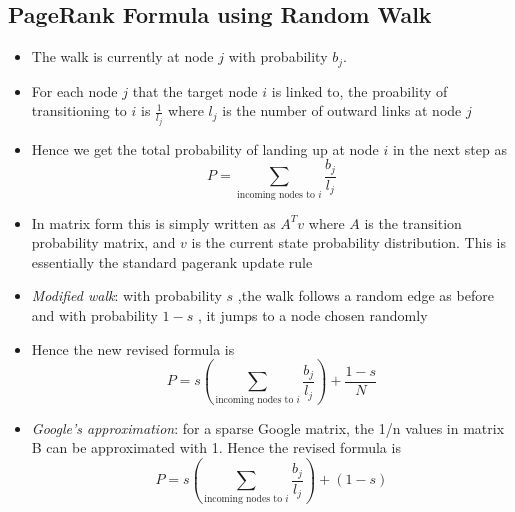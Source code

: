 \documentclass{article}
\begin{document}
\subsection{PageRank Formula using Random Walk}
\begin{itemize}
    \item The walk is currently at node $j$ with probability $b_j$. 
    
    \item For each node $j$ that the target node $i$ is linked to, the proability of transitioning to $i$ is $\frac{1}{l_j}$ where $l_j$ is the number of outward links at node $j$
    
    \item Hence we get the total probability of landing up at node $i$ in the next step as
    \begin{equation*}
        P = \sum_{\text{incoming nodes to $i$}} \frac{b_j}{l_j}
    \end{equation*}
    
    \item In matrix form this is simply written as $A^{T}v$ where $A$ is the transition probability matrix, and $v$ is the current state probability distribution. This is essentially the standard pagerank update rule
    
    \item \textit{Modified walk}: with probability $s$ ,the walk follows a random edge as before and with probability $1-s$ , it jumps to a node chosen randomly 
    
    \item Hence the new revised formula is
    \begin{equation*}
        P = s \left(\sum_{\text{incoming nodes to $i$}}  \frac{b_j}{l_j} \right) + \frac{1-s}{N}
    \end{equation*}
    
    \item \textit{Google's approximation}: for a sparse Google matrix, the 1/n values in matrix B can be approximated with 1. Hence the revised formula is
    \begin{equation*}
        P = s \left(\sum_{\text{incoming nodes to $i$}}  \frac{b_j}{l_j} \right) + (1-s)
    \end{equation*}
\end{itemize}
\end{document}
